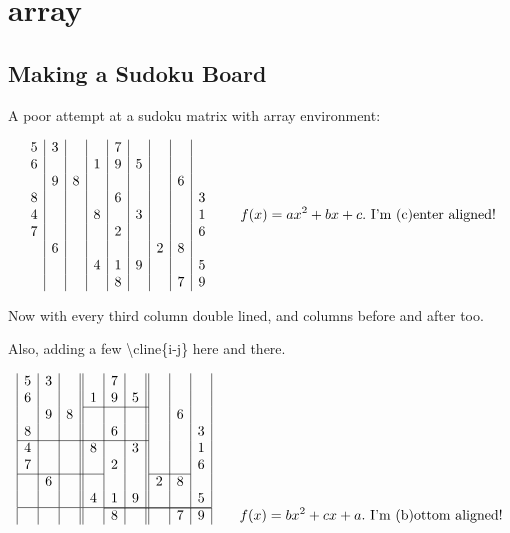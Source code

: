 \documentclass[environments-demo.tex]{subfiles}
\begin{document}
\section{array}
\subsection{Making a Sudoku Board}

A poor attempt at a sudoku matrix with array environment:

$$
\begin{array}[c]{c|c|c|c|c|c|c|c|c}
5 & 3 &   &   & 7 &   &   &   &   \\
6 &   &   & 1 & 9 & 5 &   &   &   \\
  & 9 & 8 &   &   &   &   & 6 &   \\

8 &   &   &   & 6 &   &   &   & 3 \\
4 &   &   & 8 &   & 3 &   &   & 1 \\
7 &   &   &   & 2 &   &   &   & 6 \\

  & 6 &   &   &   &   & 2 & 8 &   \\
  &   &   & 4 & 1 & 9 &   &   & 5 \\
  &   &   &   & 8 &   &   & 7 & 9 \\
\end{array}
\qquad
f(x)=ax^2+bx+c.\text{ I'm (c)enter aligned!}
$$
\bigskip

Now with every third column double lined, and columns before and after too.

Also, adding a few \textbackslash{cline\{i-j\}} here and there.

$$
\begin{array}[b]{|c|c|c||c|c|c||c|c|c|}
5 & 3 &   &   & 7 &   &   &   &   \\
6 &   &   & 1 & 9 & 5 &   &   &   \\\cline{4-6}
  & 9 & 8 &   &   &   &   & 6 &   \\

8 &   &   &   & 6 &   &   &   & 3 \\\cline{1-6}
4 &   &   & 8 &   & 3 &   &   & 1 \\
7 &   &   &   & 2 &   &   &   & 6 \\\cline{1-4}\cline{7-8}

  & 6 &   &   &   &   & 2 & 8 &   \\
  &   &   & 4 & 1 & 9 &   &   & 5 \\\hline\cline{5-9}
  &   &   &   & 8 &   &   & 7 & 9 \\
\end{array}
\qquad
f(x)=bx^2+cx+a.\text{ I'm (b)ottom aligned!}
$$
\bigskip
\end{document}
